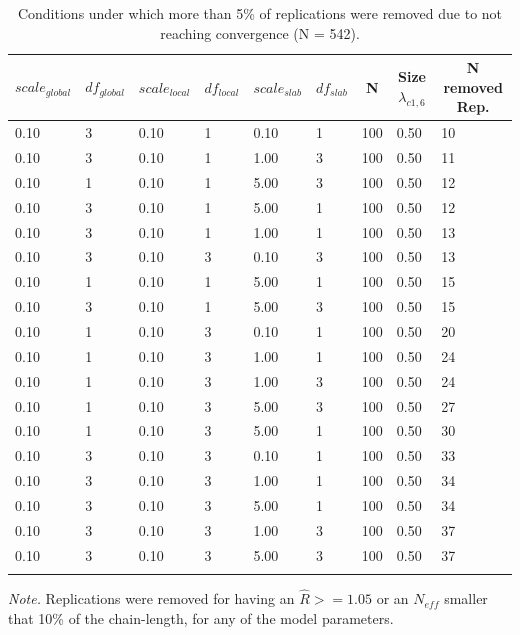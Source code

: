 \documentclass[
  man, donotrepeattitle,floatsintext]{apa6}
\begin{document}
\begin{table}[tbp]

\begin{center}
\begin{threeparttable}

\caption{\label{tab:unnamed-chunk-2}Conditions under which more than 5\% of replications were removed due to not reaching convergence (N = 542).}

\begin{tabular}{lllllllll}
\toprule
$scale_{global}$ & \multicolumn{1}{c}{$df_{global}$} & \multicolumn{1}{c}{$scale_{local}$} & \multicolumn{1}{c}{$df_{local}$} & \multicolumn{1}{c}{$scale_{slab}$} & \multicolumn{1}{c}{$df_{slab}$} & \multicolumn{1}{c}{N} & \multicolumn{1}{c}{Size $\lambda_{c1 , 6}$} & \multicolumn{1}{c}{N removed Rep.}\\
\midrule
0.10 & 3 & 0.10 & 1 & 0.10 & 1 & 100 & 0.50 & 10\\
0.10 & 3 & 0.10 & 1 & 1.00 & 3 & 100 & 0.50 & 11\\
0.10 & 1 & 0.10 & 1 & 5.00 & 3 & 100 & 0.50 & 12\\
0.10 & 3 & 0.10 & 1 & 5.00 & 1 & 100 & 0.50 & 12\\
0.10 & 3 & 0.10 & 1 & 1.00 & 1 & 100 & 0.50 & 13\\
0.10 & 3 & 0.10 & 3 & 0.10 & 3 & 100 & 0.50 & 13\\
0.10 & 1 & 0.10 & 1 & 5.00 & 1 & 100 & 0.50 & 15\\
0.10 & 3 & 0.10 & 1 & 5.00 & 3 & 100 & 0.50 & 15\\
0.10 & 1 & 0.10 & 3 & 0.10 & 1 & 100 & 0.50 & 20\\
0.10 & 1 & 0.10 & 3 & 1.00 & 1 & 100 & 0.50 & 24\\
0.10 & 1 & 0.10 & 3 & 1.00 & 3 & 100 & 0.50 & 24\\
0.10 & 1 & 0.10 & 3 & 5.00 & 3 & 100 & 0.50 & 27\\
0.10 & 1 & 0.10 & 3 & 5.00 & 1 & 100 & 0.50 & 30\\
0.10 & 3 & 0.10 & 3 & 0.10 & 1 & 100 & 0.50 & 33\\
0.10 & 3 & 0.10 & 3 & 1.00 & 1 & 100 & 0.50 & 34\\
0.10 & 3 & 0.10 & 3 & 5.00 & 1 & 100 & 0.50 & 34\\
0.10 & 3 & 0.10 & 3 & 1.00 & 3 & 100 & 0.50 & 37\\
0.10 & 3 & 0.10 & 3 & 5.00 & 3 & 100 & 0.50 & 37\\
\bottomrule
\addlinespace
\end{tabular}

\begin{tablenotes}[para]
\normalsize{\textit{Note.} Replications were removed for having an $\hat{R} >= 1.05$ or an $N_{eff}$  smaller that 10\% of the chain-length, for any of the model parameters.}
\end{tablenotes}

\end{threeparttable}
\end{center}

\end{table}
\end{document}
